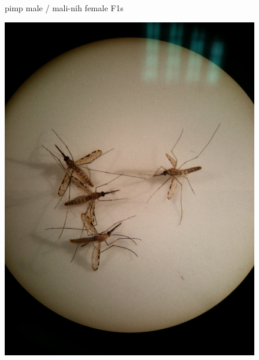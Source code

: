 \documentclass{article}
\begin{document}
\begin{figure}[p]
\begin{caption}
pimp male / mali-nih female F1s
\end{caption}

\includegraphics[scale=0.1]{pimp-♂_mali-NIH-♀}
\end{figure}
\end{document}
